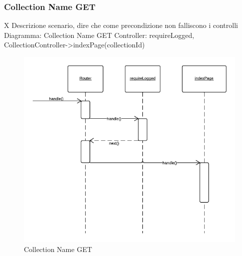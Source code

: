 \subsubsection{Collection Name GET} X
Descrizione scenario, dire che come precondizione non falliscono i controlli
Diagramma: Collection Name GET
Controller: requireLogged, CollectionController->indexPage(collectionId)
\begin{figure}[H]
	\begin{center} 
		\includegraphics[scale=0.60]{scenari/Collection Name GET.png} 
		\caption{Collection Name GET}
	\end{center} 
\end{figure}

